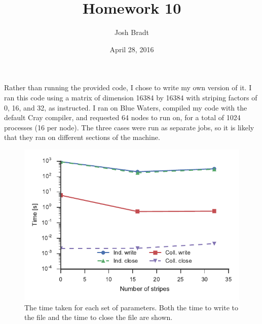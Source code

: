 \documentclass{article}
\title{Homework 10}
\author{Josh Bradt}
\date{April 28, 2016}
\begin{document}
\maketitle

Rather than running the provided code, I chose to write my own version of it. I ran this code using a matrix of dimension \num{16384} by \num{16384} with striping factors of 0, 16, and 32, as instructed. I ran on Blue Waters, compiled my code with the default Cray compiler, and requested 64 nodes to run on, for a total of 1024 processes (16 per node). The three cases were run as separate jobs, so it is likely that they ran on different sections of the machine.

\begin{figure}
    \centering
    \includegraphics{times.pdf}
    \caption{The time taken for each set of parameters. Both the time to write to the file and the time to close the file are shown.}
    \label{fig:times}
\end{figure}
\end{document}
